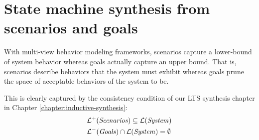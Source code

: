 \section{State machine synthesis from scenarios and goals}

With multi-view behavior modeling frameworks, scenarios capture a lower-bound of system behavior whereas goals actually capture an upper bound. That is, scenarios describe behaviors that the system must exhibit whereas goals prune the space of acceptable behaviors of the system to be. 

This is clearly captured by the consistency condition of our LTS synthesis chapter in Chapter \ref{chapter:inductive-synthesis}:
\begin{align*}
&\mathcal{L}^+(\mbox{\emph{Scenarios}}) \subseteq \mathcal{L}(\mbox{\emph{System}}) \\
&\mathcal{L}^-(\mbox{\emph{Goals}}) \cap \mathcal{L}(\mbox{\emph{System}}) = \emptyset
\end{align*}

